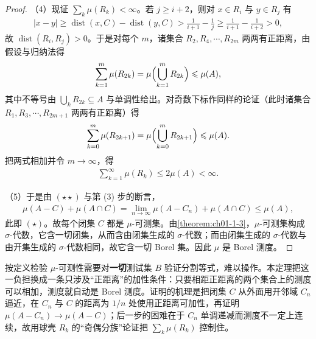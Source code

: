 \documentclass[../../main.tex]{subfiles}
\begin{document}
\begin{proof}
（4）现证 $\sum_{k}\mu(R_{k})<\infty$。若 $j\geqslant i+2$，则对 $x\in R_{i}$ 与 $y\in R_{j}$ 有
\begin{align*}
|x-y|\geqslant\operatorname{dist}(x,C)-\operatorname{dist}(y,C)>\frac{1}{i+1}-\frac{1}{j}\geqslant\frac{1}{i+1}-\frac{1}{i+2}>0,
\end{align*}
故 $\operatorname{dist}(R_{i},R_{j})>0$。于是对每个 $m$，诸集合 $R_{2},R_{4},\cdots,R_{2m}$ 两两有正距离，由假设与归纳法得
\begin{align*}
\sum_{k=1}^{m}\mu(R_{2k})=\mu\Bigl(\bigcup_{k=1}^{m}R_{2k}\Bigr)\leqslant\mu(A),
\end{align*}
其中不等号由 $\bigcup_{k}R_{2k}\subseteq A$ 与单调性给出。对奇数下标作同样的论证（此时诸集合 $R_{1},R_{3},\cdots,R_{2m+1}$ 两两有正距离）得
\begin{align*}
\sum_{k=0}^{m}\mu(R_{2k+1})=\mu\Bigl(\bigcup_{k=0}^{m}R_{2k+1}\Bigr)\leqslant\mu(A).
\end{align*}
把两式相加并令 $m\to\infty$，得
\begin{align*}
\sum_{k=1}^{\infty}\mu(R_{k})\leqslant2\mu(A)<\infty.
\end{align*}

（5）于是由 $(\star\star)$ 与第 (3) 步的断言，
\begin{align*}
\mu(A-C)+\mu(A\cap C)=\lim_{n\to\infty}\mu(A-C_{n})+\mu(A\cap C)\leqslant\mu(A),
\end{align*}
此即 $(\star)$。故每个闭集 $C$ 都是 $\mu$-可测集。由\cref{theorem:ch01-1-3}，$\mu$-可测集构成 $\sigma$-代数，它含一切闭集，从而含由闭集生成的 $\sigma$-代数；而由闭集生成的 $\sigma$-代数与由开集生成的 $\sigma$-代数相同，故它含一切 Borel 集。因此 $\mu$ 是 Borel 测度。%
\end{proof}

\begin{remark}\label{remark:ch01-thm-1-9-动机}
按定义检验 $\mu$-可测性需要对\textbf{一切}测试集 $B$ 验证分割等式，难以操作。本定理把这一负担换成一条只涉及“正距离”的加性条件：只要相距正距离的两个集合上的测度可以相加，测度就自动是 Borel 测度。证明的机理是把闭集 $C$ 从外面用开邻域 $C_{n}$ 逼近，在 $C_{n}$ 与 $C$ 的距离为 $1/n$ 处使用正距离可加性，再证明 $\mu(A-C_{n})\to\mu(A-C)$；后一步的困难在于 $C_{n}$ 单调递减而测度不一定上连续，故用球壳 $R_{k}$ 的“奇偶分族”论证把 $\sum_{k}\mu(R_{k})$ 控制住。
\end{remark}
\end{document}
